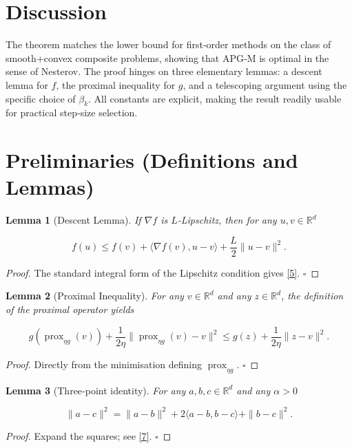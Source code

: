 \documentclass{article}
\newtheorem{lemma}{Lemma}
\newcommand{\prox}{\operatorname{prox}}
\newcommand{\R}{\mathbb{R}}
\begin{document}
\vspace{0.2cm}
\section*{Discussion}
The theorem matches the lower bound for first‑order methods on the class of smooth+convex composite problems, showing that APG‑M is optimal in the sense of Nesterov. The proof hinges on three elementary lemmas: a descent lemma for $f$, the proximal inequality for $g$, and a telescoping argument using the specific choice of $\beta_{k}$. All constants are explicit, making the result readily usable for practical step‑size selection.

\vspace{0.4cm}
\section*{Preliminaries (Definitions and Lemmas)}
\begin{lemma}[Descent Lemma]\label{lem:descent}
If $\nabla f$ is $L$‑Lipschitz, then for any $u,v\in\R^{d}$  

\[
f(u)\le f(v)+\langle\nabla f(v),u-v\rangle+\frac{L}{2}\|u-v\|^{2}. \tag{5}
\]
\end{lemma}
\begin{proof}
The standard integral form of the Lipschitz condition gives \eqref{5}. \hfill $\square$
\end{proof}

\begin{lemma}[Proximal Inequality]\label{lem:prox}
For any $v\in\R^{d}$ and any $z\in\R^{d}$, the definition of the proximal operator yields  

\[
g(\prox_{\eta g}(v)) + \frac{1}{2\eta}\bigl\|\prox_{\eta g}(v)-v\bigr\|^{2}
\le g(z)+\frac{1}{2\eta}\|z-v\|^{2}. \tag{6}
\]
\end{lemma}
\begin{proof}
Directly from the minimisation defining $\prox_{\eta g}$. \hfill $\square$
\end{proof}

\begin{lemma}[Three‑point identity]\label{lem:three}
For any $a,b,c\in\R^{d}$ and any $\alpha>0$  

\[
\|a-c\|^{2}= \|a-b\|^{2}+2\langle a-b, b-c\rangle+\|b-c\|^{2}. \tag{7}
\]
\end{lemma}
\begin{proof}
Expand the squares; see \eqref{7}. \hfill $\square$
\end{proof}
\end{document}
